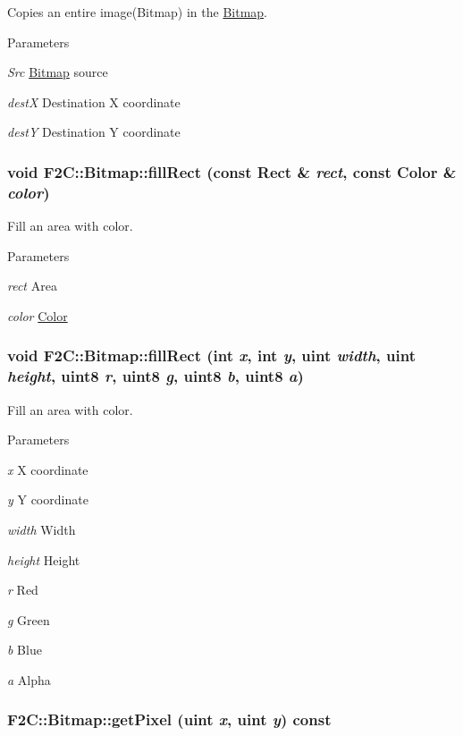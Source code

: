 Copies an entire image(Bitmap) in the \hyperlink{class_f2_c_1_1_bitmap}{Bitmap}. 
\begin{DoxyParams}{Parameters}
\item[{\em Src}]\hyperlink{class_f2_c_1_1_bitmap}{Bitmap} source \item[{\em destX}]Destination X coordinate \item[{\em destY}]Destination Y coordinate \end{DoxyParams}
\hypertarget{class_f2_c_1_1_bitmap_abe81c235fd6bdd3a4300a20395425039}{
\subsubsection[{fillRect}]{\setlength{\rightskip}{0pt plus 5cm}void F2C::Bitmap::fillRect (const {\bf Rect} \& {\em rect}, \/  const {\bf Color} \& {\em color})}}
\label{class_f2_c_1_1_bitmap_abe81c235fd6bdd3a4300a20395425039}


Fill an area with color. 
\begin{DoxyParams}{Parameters}
\item[{\em rect}]Area \item[{\em color}]\hyperlink{class_f2_c_1_1_color}{Color} \end{DoxyParams}
\hypertarget{class_f2_c_1_1_bitmap_af2961f38837be847f9e6a283ea90ba9b}{
\subsubsection[{fillRect}]{\setlength{\rightskip}{0pt plus 5cm}void F2C::Bitmap::fillRect (int {\em x}, \/  int {\em y}, \/  {\bf uint} {\em width}, \/  {\bf uint} {\em height}, \/  {\bf uint8} {\em r}, \/  {\bf uint8} {\em g}, \/  {\bf uint8} {\em b}, \/  {\bf uint8} {\em a})}}
\label{class_f2_c_1_1_bitmap_af2961f38837be847f9e6a283ea90ba9b}


Fill an area with color. 
\begin{DoxyParams}{Parameters}
\item[{\em x}]X coordinate \item[{\em y}]Y coordinate \item[{\em width}]Width \item[{\em height}]Height \item[{\em r}]Red \item[{\em g}]Green \item[{\em b}]Blue \item[{\em a}]Alpha \end{DoxyParams}
\hypertarget{class_f2_c_1_1_bitmap_ad874bb351e5e102f2ed33deba702101f}{
\subsubsection[{getPixel}]{ F2C::Bitmap::getPixel ({\bf uint} {\em x}, \/  {\bf uint} {\em y}) const}}
\label{class_f2_c_1_1_bitmap_ad874bb351e5e102f2ed33deba702101f}


